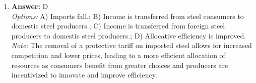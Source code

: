 \documentclass[12pt]{article}
\begin{document}
\begin{enumerate}[label=\arabic*.]
\\ \textit{Note:} Monetarist theory posits that controlling the growth rate of the money supply is essential for maintaining economic stability and preventing inflation, advocating for a consistent, predictable increase in the money supply.
\item \textbf{Answer:} D
\\ \textit{Options:} A) Imports fall.; B) Income is transferred from steel consumers to domestic steel producers.; C) Income is transferred from foreign steel producers to domestic steel producers.; D) Allocative efficiency is improved.
\\ \textit{Note:} The removal of a protective tariff on imported steel allows for increased competition and lower prices, leading to a more efficient allocation of resources as consumers benefit from greater choices and producers are incentivized to innovate and improve efficiency.
\end{enumerate}
\end{document}
